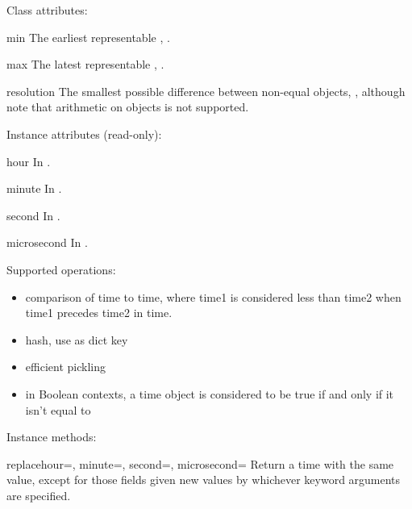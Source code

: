 Class attributes:

\begin{memberdesc}{min}
  The earliest representable , .
\end{memberdesc}

\begin{memberdesc}{max}
  The latest representable , .
\end{memberdesc}

\begin{memberdesc}{resolution}
  The smallest possible difference between non-equal 
  objects, , although note that
  arithmetic on  objects is not supported.
\end{memberdesc}

Instance attributes (read-only):

\begin{memberdesc}{hour}
  In .
\end{memberdesc}

\begin{memberdesc}{minute}
  In .
\end{memberdesc}

\begin{memberdesc}{second}
  In .
\end{memberdesc}

\begin{memberdesc}{microsecond}
  In .
\end{memberdesc}

Supported operations:

\begin{itemize}
  \item
    comparison of time to time, where time1 is considered
    less than time2 when time1 precedes time2 in time.

  \item
    hash, use as dict key

  \item
    efficient pickling

  \item
    in Boolean contexts, a time object is considered to be true
    if and only if it isn't equal to 
\end{itemize}

Instance methods:

\begin{methoddesc}{replace}{hour=, minute=, second=, microsecond=}
  Return a time with the same value, except for those fields given
  new values by whichever keyword arguments are specified.
\end{methoddesc}

